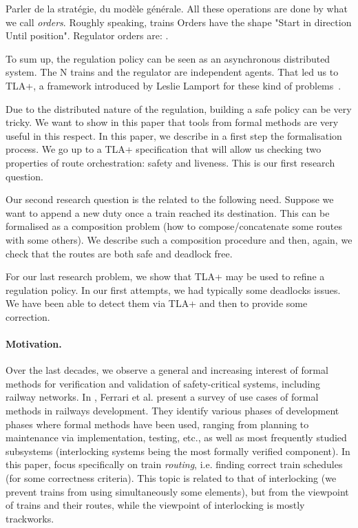 \documentclass[runningheads]{llncs}
\begin{document}
 Parler de la stratégie, du modèle générale. All these operations are done by what we call  \emph{orders}. Roughly speaking, trains Orders have the shape "Start in direction Until position". Regulator orders are: . 
 
 
 To sum up, the regulation policy can be seen as an asynchronous distributed system. The N trains and the regulator are independent agents. That led us to TLA+, a framework introduced by Leslie Lamport for these kind of problems~\cite{Lamport}.  
 
 
 
Due to the distributed nature of the regulation, building a safe policy can be very tricky. We want to show in this paper that tools from formal methods are very useful in this respect.  In this paper, we describe in  a first step the formalisation process. We go up to a TLA+ specification that will allow us checking two properties of route orchestration: safety and liveness. This is our first research question. 

Our second research question is the related to the following need. Suppose we want to append a new duty once a train reached its destination. This can be formalised as a composition problem (how to compose/concatenate some routes with some others). We describe such a composition procedure and then, again, we check that the routes are both safe and deadlock free. 

For our last research problem, we show that TLA+ may be used to refine a regulation policy. In our first attempts, we had typically some deadlocks issues. We have been able to detect them via TLA+ and then to provide some correction. 

\paragraph{Motivation.}

Over the last decades, we observe a general and increasing interest of formal methods for verification and validation of safety-critical systems, including railway networks.
In \cite{Ferrari_Formal_2022}, Ferrari et al. present a survey of use cases of formal methods in railways development. They identify various phases of development phases where formal methods have been used, ranging from planning to maintenance via implementation, testing, etc., as well as most frequently studied subsystems (interlocking systems being the most formally verified component). In this paper, focus specifically on train \emph{routing}, i.e. finding correct train schedules (for some correctness criteria). This topic is related to that of interlocking (we prevent trains from using simultaneously some elements), but from the viewpoint of trains and their routes, while the viewpoint of interlocking is mostly trackworks.
\end{document}
